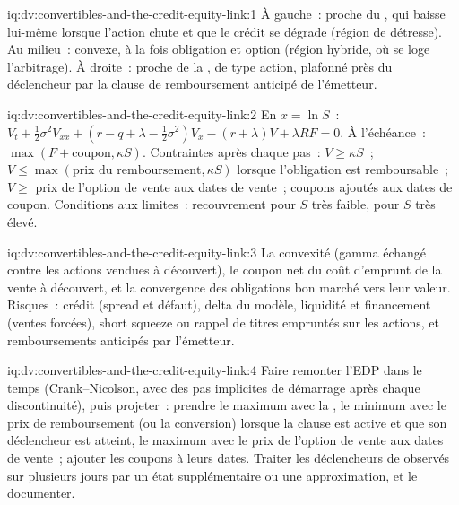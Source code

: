 \begin{solution}{iq:dv:convertibles-and-the-credit-equity-link:1}
À gauche~: proche du , qui baisse lui-même lorsque l'action chute et que le crédit se dégrade (région de détresse). Au milieu~: convexe, à la fois obligation et option
(région hybride, où se loge l'arbitrage). À droite~: proche de la , de type action, plafonné près du déclencheur par la
clause de remboursement anticipé de l'émetteur.
\end{solution}

\begin{solution}{iq:dv:convertibles-and-the-credit-equity-link:2}
En $x=\ln S$~: $V_t+\frac12\sigma^2V_{xx}+(r-q+\lambda-\frac12\sigma^2)V_x-(r+\lambda)V+\lambda RF=0$. À l'échéance~: $\max(F+\text{coupon},\kappa S)$.
Contraintes après chaque pas~: $V\ge\kappa S$~; $V\le\max(\text{prix du remboursement},\kappa S)$ lorsque l'obligation est remboursable~; $V\ge$ prix de l'option de vente aux dates de vente~; coupons ajoutés
aux dates de coupon. Conditions aux limites~: recouvrement pour $S$ très faible,  pour $S$ très élevé.
\end{solution}

\begin{solution}{iq:dv:convertibles-and-the-credit-equity-link:3}
La convexité (gamma échangé contre les actions vendues à découvert), le coupon net du coût d'emprunt de la vente à découvert, et la convergence des obligations bon marché vers leur valeur. Risques~:
crédit (spread et défaut), delta du modèle, liquidité et financement (ventes forcées), short squeeze ou rappel de titres empruntés sur les actions, et
remboursements anticipés par l'émetteur.
\end{solution}

\begin{solution}{iq:dv:convertibles-and-the-credit-equity-link:4}
Faire remonter l'EDP dans le temps (Crank--Nicolson, avec des pas implicites de démarrage après chaque discontinuité), puis projeter~: prendre le maximum avec
la , le minimum avec le prix de remboursement (ou la conversion) lorsque la clause est active et que son déclencheur est atteint, le maximum avec le prix de l'option de vente aux
dates de vente~; ajouter les coupons à leurs dates. Traiter les déclencheurs de  observés sur plusieurs jours par un état supplémentaire ou une approximation, et le documenter.
\end{solution}

